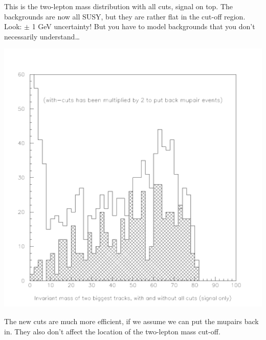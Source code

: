 \documentclass[landscape]{article}
\begin{document}
This is the two-lepton mass distribution with all cuts, signal on top.
The backgrounds are now all SUSY, but they are rather flat in the
cut-off region.  Look: $\pm$ 1 GeV uncertainty!  But you have to model
backgrounds that you don't necessarily understand\ldots

\pagebreak

\begin{center} \includegraphics[height=0.8\textheight]{withtheta_7.pdf} \end{center}

The new cuts are much more efficient, if we assume we can put the
mupairs back in.  They also don't affect the location of the
two-lepton mass cut-off.
\end{document}
